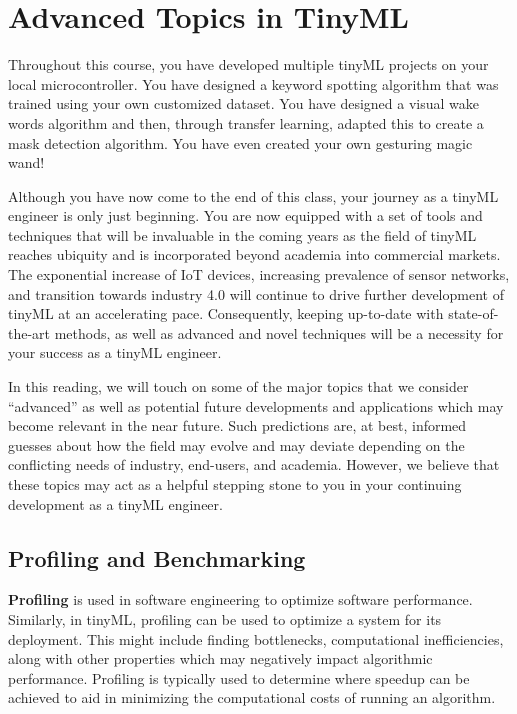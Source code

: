 \section{Advanced Topics in TinyML}

Throughout this course, you have developed multiple tinyML projects on your local microcontroller. You have designed a keyword spotting algorithm that was trained using your own customized dataset. You have designed a visual wake words algorithm and then, through transfer learning, adapted this to create a mask detection algorithm. You have even created your own gesturing magic wand!
    
Although you have now come to the end of this class, your journey as a tinyML engineer is only just beginning. You are now equipped with a set of tools and techniques that will be invaluable in the coming years as the field of tinyML reaches ubiquity and is incorporated beyond academia into commercial markets. The exponential increase of IoT devices, increasing prevalence of sensor networks, and transition towards industry 4.0 will continue to drive further development of tinyML at an accelerating pace. Consequently, keeping up-to-date with state-of-the-art methods, as well as advanced and novel techniques will be a necessity for your success as a tinyML engineer.
    
In this reading, we will touch on some of the major topics that we consider “advanced” as well as potential future developments and applications which may become relevant in the near future. Such predictions are, at best, informed guesses about how the field may evolve and may deviate depending on the conflicting needs of industry, end-users, and academia. However, we believe that these topics may act as a helpful stepping stone to you in your continuing development as a tinyML engineer.
    
\subsection{Profiling and Benchmarking}

\textbf{Profiling} is used in software engineering to optimize software performance. Similarly, in tinyML, profiling can be used to optimize a system for its deployment. This might include finding bottlenecks, computational inefficiencies, along with other properties which may negatively impact algorithmic performance. Profiling is typically used to determine where speedup can be achieved to aid in minimizing the computational costs of running an algorithm.
    

